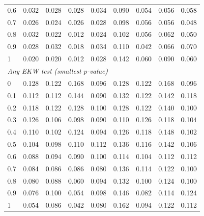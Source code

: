 \begin{table}[htbp]
\begin{tabular}{lcccccccc}
0.6 & 0.032 & 0.028 & 0.028 & 0.034 & 0.090 & 0.054 & 0.056 & 0.058 \\
0.7 & 0.026 & 0.024 & 0.026 & 0.028 & 0.098 & 0.056 & 0.056 & 0.048 \\
0.8 & 0.032 & 0.022 & 0.012 & 0.024 & 0.102 & 0.056 & 0.062 & 0.050 \\
0.9 & 0.028 & 0.032 & 0.018 & 0.034 & 0.110 & 0.042 & 0.066 & 0.070 \\
1 & 0.020 & 0.020 & 0.012 & 0.028 & 0.142 & 0.060 & 0.090 & 0.060 \\
\midrule
\multicolumn{9}{l}{\textit{Any EKW test (smallest $p$-value)}} \\
0 & 0.128 & 0.122 & 0.168 & 0.096 & 0.128 & 0.122 & 0.168 & 0.096 \\
0.1 & 0.112 & 0.112 & 0.144 & 0.090 & 0.132 & 0.122 & 0.142 & 0.118 \\
0.2 & 0.118 & 0.122 & 0.128 & 0.100 & 0.128 & 0.122 & 0.140 & 0.100 \\
0.3 & 0.126 & 0.106 & 0.098 & 0.090 & 0.110 & 0.126 & 0.118 & 0.104 \\
0.4 & 0.110 & 0.102 & 0.124 & 0.094 & 0.126 & 0.118 & 0.148 & 0.102 \\
0.5 & 0.104 & 0.098 & 0.110 & 0.112 & 0.136 & 0.116 & 0.142 & 0.106 \\
0.6 & 0.088 & 0.094 & 0.090 & 0.100 & 0.114 & 0.104 & 0.112 & 0.112 \\
0.7 & 0.084 & 0.086 & 0.086 & 0.080 & 0.136 & 0.114 & 0.122 & 0.100 \\
0.8 & 0.080 & 0.088 & 0.060 & 0.094 & 0.132 & 0.100 & 0.124 & 0.100 \\
0.9 & 0.076 & 0.100 & 0.054 & 0.098 & 0.146 & 0.082 & 0.114 & 0.124 \\
1 & 0.054 & 0.086 & 0.042 & 0.080 & 0.162 & 0.094 & 0.122 & 0.112 \\
\bottomrule
\end{tabular}
\par\smallskip

\end{table}
